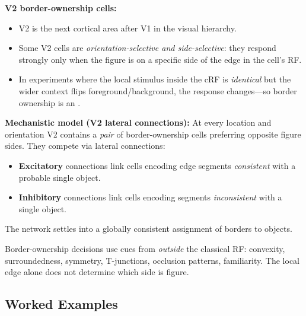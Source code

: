\separator

\textbf{V2 border-ownership cells:}

\begin{itemize}
  \item V2 is the next cortical area after V1 in the visual hierarchy.
  \item Some V2 cells are \emph{orientation-selective and side-selective}: they respond strongly only when the figure is on a specific side of the edge in the cell's RF.
  \item In experiments where the local stimulus inside the cRF is \emph{identical} but the wider context flips foreground/background, the response changes---so border ownership is an .
\end{itemize}

\textbf{Mechanistic model (V2 lateral connections):}
At every location and orientation V2 contains a \emph{pair} of border-ownership cells preferring opposite figure sides. They compete via lateral connections:
\begin{itemize}
  \item \textbf{Excitatory} connections link cells encoding edge segments \emph{consistent} with a probable single object.
  \item \textbf{Inhibitory} connections link cells encoding segments \emph{inconsistent} with a single object.
\end{itemize}
The network settles into a globally consistent assignment of borders to objects.

\begin{tipbox}
Border-ownership decisions use cues from \emph{outside} the classical RF: convexity, surroundedness, symmetry, T-junctions, occlusion patterns, familiarity. The local edge alone does not determine which side is figure.
\end{tipbox}

\bigseparator

\subsection{Worked Examples}

